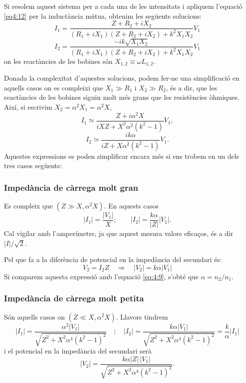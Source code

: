 \documentclass[a4paper,10.5pt]{report}
\begin{document}
Si resolem aquest sistema per a cada una de les intensitats i apliquem l'equació \eqref{eq4:12} per la inductància mútua, obtenim les següents solucions:
\begin{equation}
	I_1 = \frac{Z + R_2 + iX_2}{(R_1 + iX_1)(Z + R_2 + iX_2) + k^2 X_1 X_2} V_1 \label{eq4:15}
\end{equation}
\begin{equation}
	I_2 = \frac{-ik\sqrt{X_1 X_2}}{(R_1 + iX_1)(Z + R_2 + iX_2) + k^2 X_1 X_2} V_1 \label{eq4:16}
\end{equation}
on les reactàncies de les bobines són $X_{1,2} \equiv \omega L_{1,2}$.

Donada la complexitat d'aquestes solucions, podem fer-ne una simplificació en aquells casos on es compleixi que $X_1 \gg R_1$ i $X_2 \gg R_2$, és a dir, que les reactàncies de les bobines siguin molt més grans que les resistències òhmiques. Així, si escrivim $X_2 = \alpha^2 X_1 = \alpha^2 X$,
\begin{equation}
	I_1 \simeq \frac{Z + i\alpha^2 X}{iX Z + X^2 \alpha^2 (k^2 - 1)} V_1, \label{eq4:17}
\end{equation}
\begin{equation}
	I_2 \simeq \frac{i k \alpha}{iZ + X \alpha^2 (k^2 - 1)} V_1. \label{eq4:18}
\end{equation}
Aquestes expressions es poden simplificar encara més si ens trobem en un dels tres casos següents:
\subsubsection{Impedància de càrrega molt gran}
Es compleix que $(Z \gg X,\alpha^2X)$. En aquests casos
\begin{equation}
	|I_1| =  \frac{|V_1|}{X}  ; \qquad |I_2| = \frac{k \alpha}{|Z|} |V_1|.
	\label{eq4:19}
\end{equation}
Cal vigilar amb l'amperímetre, ja que aquest mesura valors eficaços, és a dir $|I|/\sqrt{2}$.

Pel que fa a la diferència de potencial en la impedància del secundari és:
\begin{equation}
	V_2 = I_2 Z \quad \Longrightarrow \quad |V_2| = k \alpha |V_1|
	\label{eq4:20}
\end{equation}
Si comparem aquesta expressió amb l'equació \eqref{eq:4:9}, s'obté que $\alpha = n_2/n_1$.
\subsubsection{Impedància de càrrega molt petita}
Són aquells casos on $(Z \ll X,\alpha^2X)$. Llavors tindrem
\begin{equation}
	|I_1| = \frac{\alpha^2 |V_1|}{\sqrt{Z^2 + X^2 \alpha^4 (k^2 - 1)^2}} \quad ; \quad
	|I_2| = \frac{k \alpha |V_1|}{\sqrt{Z^2 + X^2 \alpha^4 (k^2 - 1)^2}} = \frac{k}{\alpha} |I_1|
	\label{eq4:21}
\end{equation}
i el potencial en la impedància del secundari serà
\begin{equation}
	|V_2| = \frac{k \alpha |Z| \, |V_1|}{\sqrt{Z^2 + X^2 \alpha^4 (k^2 - 1)^2}}.
	\label{eq4:22}
\end{equation}
\end{document}
